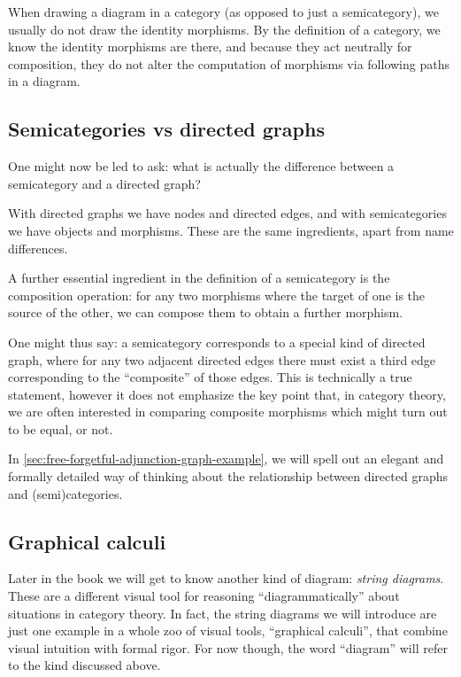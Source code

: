 \begin{remark}
When drawing a diagram in a category (as opposed to just a semicategory), we usually do not draw the identity morphisms. By the definition of a category, we know the identity morphisms are there, and because they act neutrally for composition, they do not alter the computation of morphisms via following paths in a diagram. 
\end{remark}



\subsection{Semicategories vs directed graphs}

One might now be led to ask: what is actually the difference between a semicategory and a directed graph?

With directed graphs we have nodes and directed edges, and with semicategories we have objects and morphisms. These are the same ingredients, apart from name differences.

A further essential ingredient in the definition of a semicategory is the composition operation: for any two morphisms where the target of one is the source of the other, we can compose them to obtain a further morphism. 

One might thus say: a semicategory corresponds to a special kind of directed graph, where for any two adjacent directed edges there must exist a third edge corresponding to the ``composite'' of those edges.
This is technically a true statement, however it does not emphasize the key point that, in category theory, we are often interested in comparing composite morphisms which might turn out to be equal, or not. 

In \cref{sec:free-forgetful-adjunction-graph-example}, we will spell out an elegant and formally detailed way of thinking about the relationship between directed graphs and (semi)categories. 

\subsection{Graphical calculi}


Later in the book we will get to know another kind of diagram: \emph{string diagrams}. These are a different visual tool for reasoning ``diagrammatically'' about situations in category theory. In fact, the string diagrams we will introduce are just one example in a whole zoo of visual tools, ``graphical calculi'', that combine visual intuition with formal rigor. For now though, the word ``diagram'' will refer to the kind discussed above. 

